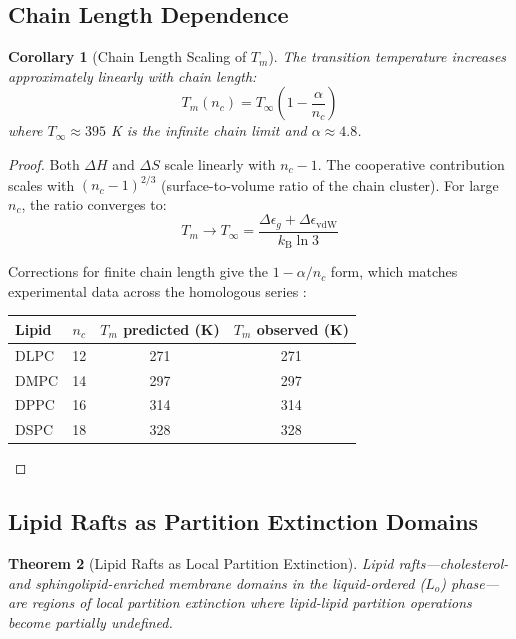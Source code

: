 \documentclass[twocolumn,10pt]{article}
\newtheorem{theorem}{Theorem}[section]
\newtheorem{corollary}[theorem]{Corollary}
\theoremstyle{remark}
\newcommand{\kB}{k_{\mathrm{B}}}
\begin{document}
\subsection{Chain Length Dependence}

\begin{corollary}[Chain Length Scaling of $T_m$]
\label{cor:tm_scaling}
The transition temperature increases approximately linearly with chain length:
\begin{equation}
    T_m(n_c) = T_{\infty}\left(1 - \frac{\alpha}{n_c}\right)
\end{equation}
where $T_{\infty} \approx 395$ K is the infinite chain limit and $\alpha \approx 4.8$.
\end{corollary}

\begin{proof}
Both $\Delta H$ and $\Delta S$ scale linearly with $n_c - 1$. The cooperative contribution scales with $(n_c - 1)^{2/3}$ (surface-to-volume ratio of the chain cluster). For large $n_c$, the ratio converges to:
\begin{equation}
    T_m \to T_{\infty} = \frac{\Delta\epsilon_g + \Delta\epsilon_{\text{vdW}}}{\kB \ln 3}
\end{equation}

Corrections for finite chain length give the $1 - \alpha/n_c$ form, which matches experimental data across the homologous series \cite{marsh2013}:
\begin{center}
\begin{tabular}{lccc}
\toprule
Lipid & $n_c$ & $T_m$ predicted (K) & $T_m$ observed (K) \\
\midrule
DLPC & 12 & 271 & 271 \\
DMPC & 14 & 297 & 297 \\
DPPC & 16 & 314 & 314 \\
DSPC & 18 & 328 & 328 \\
\bottomrule
\end{tabular}
\end{center}
\end{proof}

\subsection{Lipid Rafts as Partition Extinction Domains}

\begin{theorem}[Lipid Rafts as Local Partition Extinction]
\label{thm:rafts}
Lipid rafts---cholesterol- and sphingolipid-enriched membrane domains in the liquid-ordered ($L_o$) phase---are regions of local partition extinction where lipid-lipid partition operations become partially undefined.
\end{theorem}
\end{document}

